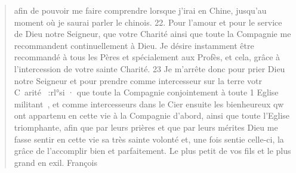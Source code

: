 \begin{quote}
afin de pouvoir me faire comprendre lorsque j'irai en Chine,
jusqu'au moment où je saurai parler le chinois.
22. Pour l'amour et pour le service de Dieu notre Seigneur, que
votre Charité ainsi que toute la Compagnie me recommandent
continuellement à Dieu. Je désire instamment être recommandé à
tous les Pères et spécialement aux Profès, et cela, grâce à l'intercession
de votre sainte Charité.
23 Je m'arrête donc pour prier Dieu notre Seigneur et pour
prendre comme intercesseur sur la terre votr~ C~arité~ :rl°si · que
toute la Compagnie conjointement à toute 1 Eglise militant~, et
comme intercesseurs dans le Cier ensuite les bienheureux qw ont
appartenu en cette vie à la Compagnie d'abord, ainsi que toute
l'Eglise triomphante, afin que par leurs prières et que par leurs
mérites Dieu me fasse sentir en cette vie sa très sainte volonté et,
une fois sentie celle-ci, la grâce de l'accomplir bien et parfaitement.
Le plus petit de vos fils et le plus grand en exil.
François
\end{quote}
